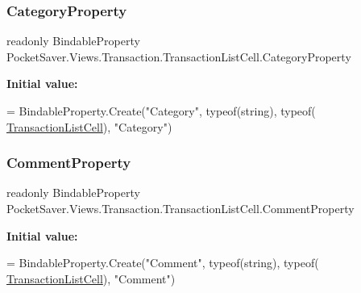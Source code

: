 \subsubsection{\texorpdfstring{Category\+Property}{CategoryProperty}}
{\footnotesize\ttfamily readonly Bindable\+Property Pocket\+Saver.\+Views.\+Transaction.\+Transaction\+List\+Cell.\+Category\+Property\hspace{0.3cm}{\ttfamily [static]}}

{\bfseries Initial value\+:}
\begin{DoxyCode}
=
            BindableProperty.Create(\textcolor{stringliteral}{"Category"}, typeof(\textcolor{keywordtype}{string}), typeof(
      \hyperlink{class_pocket_saver_1_1_views_1_1_transaction_1_1_transaction_list_cell_a26039352cfde76eb1bca9b6c2141fae1}{TransactionListCell}), \textcolor{stringliteral}{"Category"})
\end{DoxyCode}
\mbox{\label{class_pocket_saver_1_1_views_1_1_transaction_1_1_transaction_list_cell_a3c4421afb9db0560a2e0f9fc3d308e70}} 
\subsubsection{\texorpdfstring{Comment\+Property}{CommentProperty}}
{\footnotesize\ttfamily readonly Bindable\+Property Pocket\+Saver.\+Views.\+Transaction.\+Transaction\+List\+Cell.\+Comment\+Property\hspace{0.3cm}{\ttfamily [static]}}

{\bfseries Initial value\+:}
\begin{DoxyCode}
=
            BindableProperty.Create(\textcolor{stringliteral}{"Comment"}, typeof(\textcolor{keywordtype}{string}), typeof(
      \hyperlink{class_pocket_saver_1_1_views_1_1_transaction_1_1_transaction_list_cell_a26039352cfde76eb1bca9b6c2141fae1}{TransactionListCell}), \textcolor{stringliteral}{"Comment"})
\end{DoxyCode}
\mbox{\label{class_pocket_saver_1_1_views_1_1_transaction_1_1_transaction_list_cell_a12b30ce09e98a1fbbd57ab148e8d4700}} 
